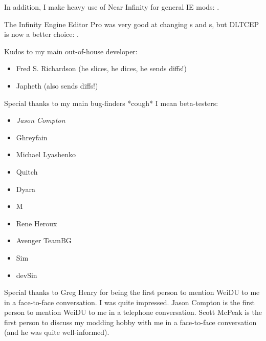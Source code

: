\documentclass{article}
\def\ttref#1{\ahrefloc{#1}{\tt #1}}
\begin{document}
In addition, I make heavy use of Near Infinity for general IE mods: .

The Infinity Engine Editor Pro was very good at changing \ttref{ITM}s and
\ttref{SPL}s, but DLTCEP is now a better choice:
.

Kudos to my main out-of-house developer:
\begin{itemize}
\item Fred S. Richardson (he slices, he dices, he sends diffs!)
\item Japheth (also sends diffs!)
\end{itemize}

Special thanks to my main bug-finders *cough* I mean beta-testers:
\begin{itemize}
\item {\em Jason Compton }
\item Ghreyfain
\item Michael Lyashenko
\item Quitch
\item Dyara
\item M
\item Rene Heroux
\item Avenger TeamBG
\item Sim
\item devSin

\end{itemize}

Special thanks to Greg Henry for being the first person to mention WeiDU to
me in a face-to-face conversation. I was quite impressed. Jason Compton is
the first person to mention WeiDU to me in a telephone conversation. Scott
McPeak is the first person to discuss my modding hobby with me in a
face-to-face conversation (and he was quite well-informed).
\end{document}
